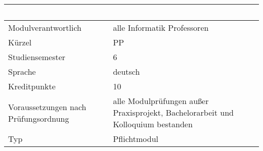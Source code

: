 \begin{longtable}[]{@{}ll@{}}
\toprule
\begin{minipage}[b]{0.12\columnwidth}\raggedright\strut
~\strut
\end{minipage} & \begin{minipage}[b]{0.12\columnwidth}\raggedright\strut
~\strut
\end{minipage}\tabularnewline
\midrule
\endhead
\begin{minipage}[t]{0.12\columnwidth}\raggedright\strut
Modulverantwortlich\strut
\end{minipage} & \begin{minipage}[t]{0.12\columnwidth}\raggedright\strut
alle Informatik Professoren\strut
\end{minipage}\tabularnewline
\begin{minipage}[t]{0.12\columnwidth}\raggedright\strut
Kürzel\strut
\end{minipage} & \begin{minipage}[t]{0.12\columnwidth}\raggedright\strut
PP\strut
\end{minipage}\tabularnewline
\begin{minipage}[t]{0.12\columnwidth}\raggedright\strut
Studiensemester\strut
\end{minipage} & \begin{minipage}[t]{0.12\columnwidth}\raggedright\strut
6\strut
\end{minipage}\tabularnewline
\begin{minipage}[t]{0.12\columnwidth}\raggedright\strut
Sprache\strut
\end{minipage} & \begin{minipage}[t]{0.12\columnwidth}\raggedright\strut
deutsch\strut
\end{minipage}\tabularnewline
\begin{minipage}[t]{0.12\columnwidth}\raggedright\strut
Kreditpunkte\strut
\end{minipage} & \begin{minipage}[t]{0.12\columnwidth}\raggedright\strut
10\strut
\end{minipage}\tabularnewline
\begin{minipage}[t]{0.12\columnwidth}\raggedright\strut
Voraussetzungen nach Prüfungsordnung\strut
\end{minipage} & \begin{minipage}[t]{0.12\columnwidth}\raggedright\strut
alle Modulprüfungen außer Praxisprojekt, Bachelorarbeit und Kolloquium
bestanden\strut
\end{minipage}\tabularnewline
\begin{minipage}[t]{0.12\columnwidth}\raggedright\strut
Typ\strut
\end{minipage} & \begin{minipage}[t]{0.12\columnwidth}\raggedright\strut
Pflichtmodul\strut
\end{minipage}\tabularnewline
\bottomrule
\end{longtable}

